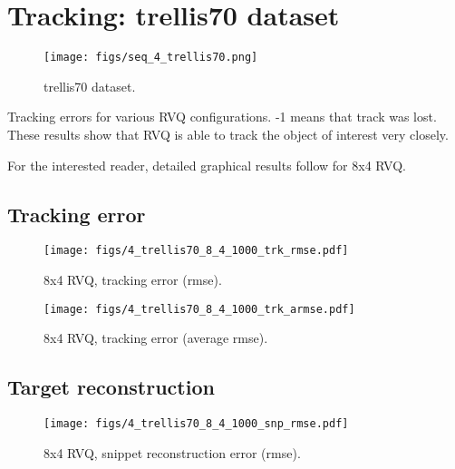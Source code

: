 \clearpage
\newpage
\section{Tracking: trellis70 dataset} 
								\begin{figure}[h]
								\centering
								\texttt{[image: figs/seq\_4\_trellis70.png]}
								\caption{trellis70 dataset.}
								\label{fig:seq_4_trellis70}
								\end{figure}



\begin{table}[h]
\centering

\caption{Tracking errors for various RVQ configurations.  -1 means that track was lost.  These results show that RVQ is able to track the object of interest very closely.}
\end{table}

For the interested reader, detailed graphical results follow for 8x4 RVQ.
\clearpage
\newpage
\subsection{Tracking error}

								\begin{figure}[h!]
								\centering
								\texttt{[image: figs/4\_trellis70\_8\_4\_1000\_trk\_rmse.pdf]}
								\caption{8x4 RVQ, tracking error (rmse).}
								\label{fig:4_trellis70_8_4_1000_trk_rmse}
								\end{figure}


								\begin{figure}[h!]
								\centering
								\texttt{[image: figs/4\_trellis70\_8\_4\_1000\_trk\_armse.pdf]}
								\caption{8x4 RVQ, tracking error (average rmse).}
								\label{fig:4_trellis70_8_4_1000_trk_avg_rmse}
								\end{figure}

\clearpage
\newpage
\subsection{Target reconstruction}

								\begin{figure}[h!]
								\centering
								\texttt{[image: figs/4\_trellis70\_8\_4\_1000\_snp\_rmse.pdf]}
								\caption{8x4 RVQ, snippet reconstruction error (rmse).}
								\label{fig:4_trellis70_8_4_1000_snp_rmse}
								\end{figure}


